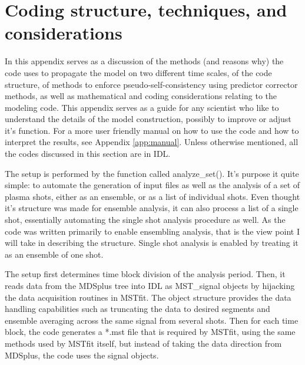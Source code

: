 \chapter{Coding structure, techniques, and considerations}\label{app:code}

In this appendix serves as a discussion of the methods (and reasons why) the code uses to propagate the model on two different time scales, of the code structure, of methods to enforce pseudo-self-consistency using predictor corrector methods, as well as mathematical and coding considerations relating to the modeling code. This appendix serves as a guide for any scientist who like to understand the details of the model construction, possibly to improve or adjust it's function. For a more user friendly manual on how to use the code and how to interpret the results, see Appendix \ref{app:manual}. Unless otherwise mentioned, all the codes discussed in this section are in IDL.




The setup is performed by the function called analyze\_set(). It's purpose it quite simple: to automate the generation of input files as well as the analysis of a set of plasma shots, either as an ensemble, or as a list of individual shots. Even thought it's structure was made for ensemble analysis, it can also process a list of a single shot, essentially automating the single shot analysis procedure as well. As the code was written primarily to enable ensembling analysis, that is the view point I will take in describing the structure. Single shot analysis is enabled by treating it as an ensemble of one shot. 

The setup first determines time block  division of the analysis period. Then, it reads data from the MDSplus tree into IDL as MST\_signal objects by hijacking the data acquisition routines in MSTfit. The object structure provides the data handling capabilities such as truncating the data to desired segments and ensemble averaging across the same signal from several shots. Then for each time block, the code generates a *.mst file that is required by MSTfit, using the same methods used by MSTfit itself, but instead of taking the data direction from MDSplus, the code uses the signal objects.